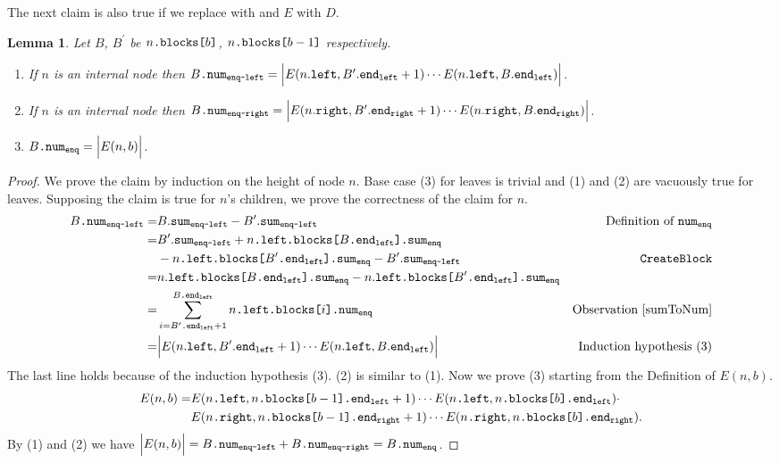 \documentclass[10pt]{article}
\newcommand{\sub}[1]{\textsubscript{#1}}
\newcommand{\nf}[1]{{\normalfont{\texttt{#1}}}}
\newtheorem{lemma}[theorem]{Lemma}
\theoremstyle{definition}
\begin{document}
The next claim is also true if we replace \nf{enq} with \nf{deq} and $E$ with $D$.
\begin{lemma}\label{lem::numX}
Let $B$, $B^\prime$ be $n\nf{.blocks[}b\nf{]}$, $n\nf{.blocks[}b-1\nf{]}$ respectively.
\begin{enumerate}[label=(\arabic*)]
    \item If $n$ is an internal node then $B\nf{.num\sub{enq-left}}=\Big|E(n.\nf{left},B^\prime.\nf{end\sub{left}}+1)\cdots E(n.\nf{left},B.\nf{end\sub{left}})\Big|$.
    \item If $n$ is an internal node then $B\nf{.num\sub{enq-right}}=\Big|E(n.\nf{right},B^\prime.\nf{end\sub{right}}+1)\cdots E(n.\nf{right},B.\nf{end\sub{right}})\Big|$.
    \item $B\nf{.num\sub{enq}}=\Big|E(n,b)\Big|$.
\end{enumerate}
\end{lemma}
\begin{proof}
 We prove the claim by induction on the height of node $n$. Base case (3) for leaves is trivial and (1) and (2) are vacuously true for leaves. Supposing the claim is true for $n$'s children, we prove the correctness of the claim for $n$.
\begin{align*}
    B\nf{.num\sub{enq-left}}=&B.\nf{sum\sub{enq-left}}-B^\prime.\nf{sum\sub{enq-left}}& \text{Definition of }\nf{num\sub{enq}}\\
    =& B^\prime.\nf{sum\sub{enq-left}}+n\nf{.left.blocks[}B\nf{.end\sub{left}].sum\sub{enq}}\\&-n\nf{.left.blocks[}B^\prime\nf{.end\sub{left}].sum\sub{enq}}-B^\prime.\nf{sum\sub{enq-left}} & \nf{CreateBlock}\\
    =& n.\nf{left.blocks[}B\nf{.end\sub{left}].sum\sub{enq}}- n.\nf{left.blocks[}B^\prime\nf{.end\sub{left}].sum\sub{enq}}\\
    =& \sum_{i=B^\prime\nf{.end\sub{left}}+1}^{B\nf{.end\sub{left}}}  n\nf{.left.blocks[}i\nf{].num\sub{enq}} &\text{Observation } \ref{sumToNum}\\
    =& \Big|E(n.\nf{left},B^\prime.\nf{end\sub{left}}+1)\cdots E(n.\nf{left},B.\nf{end\sub{left}})\Big| & \textrm{Induction hypothesis (3)}
\end{align*}
The last line holds because of the induction hypothesis (3). (2) is similar to (1). Now we prove (3) starting from the Definition of $E(n,b)$.
\begin{align*} 
E(n,b) =&  E(n\nf{.left},n\nf{.blocks[}b-1\nf{].end\sub{left}}+1)\cdots E(n\nf{.left},n\nf{.blocks[}b\nf{].end\sub{left}})\cdot \\ 
&E(n\nf{.right},n\nf{.blocks[}b-1\nf{].end\sub{right}}+1)\cdots E(n\nf{.right},n\nf{.blocks[}b\nf{].end\sub{right}}).
\end{align*}
By (1) and (2) we have $\Big|E(n,b)\Big|=B\nf{.num\sub{enq-left}}+B\nf{.num\sub{enq-right}}=B\nf{.num\sub{enq}}$.
\end{proof}
\end{document}
